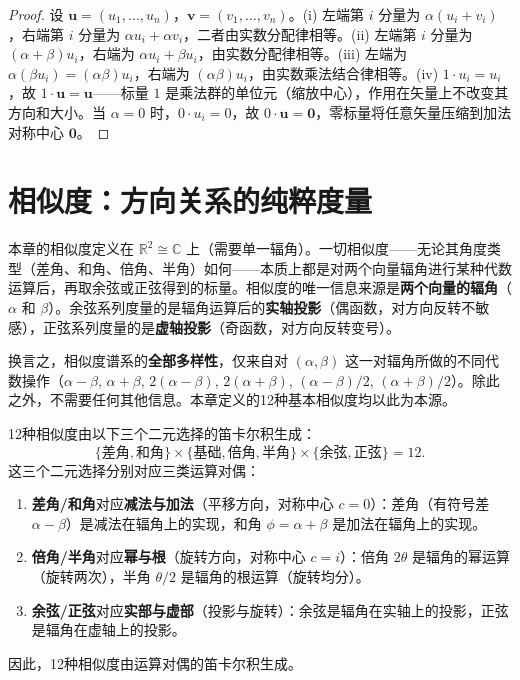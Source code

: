 \begin{proof}
设 $\mathbf{u} = (u_1,\dots,u_n)$，$\mathbf{v} = (v_1,\dots,v_n)$。(i) 左端第 $i$ 分量为 $\alpha(u_i + v_i)$，右端第 $i$ 分量为 $\alpha u_i + \alpha v_i$，二者由实数分配律相等。(ii) 左端第 $i$ 分量为 $(\alpha+\beta)u_i$，右端为 $\alpha u_i + \beta u_i$，由实数分配律相等。(iii) 左端为 $\alpha(\beta u_i) = (\alpha\beta)u_i$，右端为 $(\alpha\beta)u_i$，由实数乘法结合律相等。(iv) $1 \cdot u_i = u_i$，故 $1\cdot\mathbf{u} = \mathbf{u}$——标量 $1$ 是乘法群的单位元（缩放中心），作用在矢量上不改变其方向和大小。当 $\alpha = 0$ 时，$0\cdot u_i = 0$，故 $0\cdot\mathbf{u} = \mathbf{0}$，零标量将任意矢量压缩到加法对称中心 $\mathbf{0}$。
\end{proof}

\section{\texorpdfstring{相似度：方向关系的纯粹度量}{相似度：方向关系的纯粹度量}}

\begin{definition}[相似度的计算本源]\label{def:similarity_root}
本章的相似度定义在 $\mathbb{R}^2\cong\mathbb{C}$ 上（需要单一辐角）。一切相似度——无论其角度类型（差角、和角、倍角、半角）如何——本质上都是对两个向量辐角进行某种代数运算后，再取余弦或正弦得到的标量。相似度的唯一信息来源是\textbf{两个向量的辐角}（$\alpha$ 和 $\beta$）。余弦系列度量的是辐角运算后的\textbf{实轴投影}（偶函数，对方向反转不敏感），正弦系列度量的是\textbf{虚轴投影}（奇函数，对方向反转变号）。

换言之，相似度谱系的\textbf{全部多样性}，仅来自对 $(\alpha, \beta)$ 这一对辐角所做的不同代数操作（$\alpha - \beta$, $\alpha + \beta$, $2(\alpha - \beta)$, $2(\alpha + \beta)$, $(\alpha - \beta)/2$, $(\alpha + \beta)/2$）。除此之外，不需要任何其他信息。本章定义的12种基本相似度均以此为本源。
\end{definition}

\begin{lemma}[12种相似度的生成]\label{lem:similarity_generation}
12种相似度由以下三个二元选择的笛卡尔积生成：
\[
\{\text{差角}, \text{和角}\} \times \{\text{基础}, \text{倍角}, \text{半角}\} \times \{\text{余弦}, \text{正弦}\} = 12.
\]
这三个二元选择分别对应三类运算对偶：
\begin{enumerate}[label=(\roman*)]
    \item \textbf{差角/和角}对应\textbf{减法与加法}（平移方向，对称中心 $c=0$）：差角（有符号差 $\alpha - \beta$）是减法在辐角上的实现，和角 $\phi = \alpha + \beta$ 是加法在辐角上的实现。
    \item \textbf{倍角/半角}对应\textbf{幂与根}（旋转方向，对称中心 $c=i$）：倍角 $2\theta$ 是辐角的幂运算（旋转两次），半角 $\theta/2$ 是辐角的根运算（旋转均分）。
    \item \textbf{余弦/正弦}对应\textbf{实部与虚部}（投影与旋转）：余弦是辐角在实轴上的投影，正弦是辐角在虚轴上的投影。
\end{enumerate}
因此，12种相似度由运算对偶的笛卡尔积生成。
\end{lemma}

